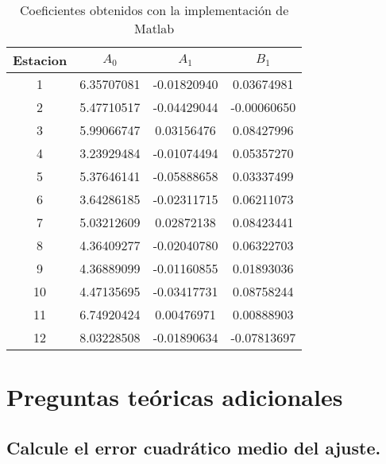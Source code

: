 \documentclass[]{article}
\begin{document}
\begin{table}[h!tbp]
    \centering
	\begin{tabular}{|c|c|c|c|}
		\hline 
		Estacion & $A_0$ & $A_1$ & $B_1$ \\
		\hline \hline
		1 & 6.35707081 &	-0.01820940	& 0.03674981 \\ \hline
		2 & 5.47710517 &	-0.04429044 &	-0.00060650\\ \hline
		3 &5.99066747 &	0.03156476 &	0.08427996\\ \hline
		4 & 3.23929484 &	-0.01074494 &	0.05357270 \\ \hline
		5 & 5.37646141 &	-0.05888658 &	0.03337499\\ \hline
		6 &3.64286185 &	-0.02311715 &	0.06211073\\ \hline
		7 & 5.03212609 &	0.02872138 &	0.08423441\\ \hline
		8 &4.36409277 &	-0.02040780 &	0.06322703 \\ \hline
		9 &4.36889099 &	-0.01160855 &	0.01893036 \\ \hline
		10 & 4.47135695 &	-0.03417731 &	0.08758244 \\ \hline
		11 & 6.74920424 &	0.00476971 &	0.00888903 \\ \hline
		12 & 8.03228508 &	-0.01890634 &	-0.07813697 \\\hline

	\end{tabular}
	\caption{Coeficientes obtenidos con la implementación de Matlab}
	\label{table:}
\end{table}

\pagebreak

\section{Preguntas teóricas adicionales}

\subsection{Calcule el error cuadrático medio del ajuste.}
\end{document}
